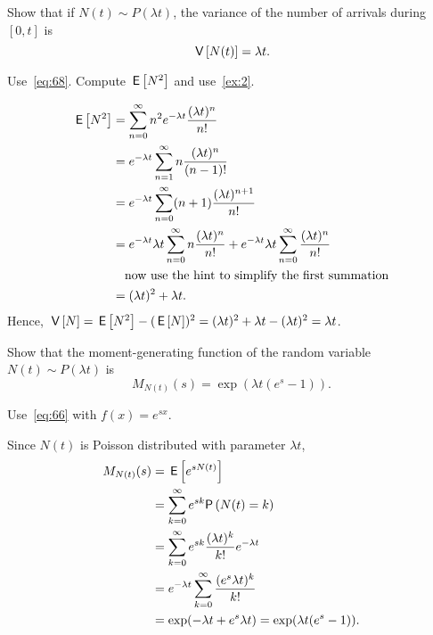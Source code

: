 \begin{extra}
  Show that if $N(t)\sim P(\lambda t)$, the variance of the number of arrivals during $[0,t]$ is
  \begin{equation*}
\,\mathsf{V}\left[N(t)\right] = \lambda t.
  \end{equation*}
\begin{hint} Use~\cref{eq:68}. Compute $\,\mathsf{E}\left[N^2\right]$ and use~\cref{ex:2}.
\end{hint}
\begin{solution} 

    \begin{align*}
      \,\mathsf{E}\left[N^2\right]
&= \sum_{n=0}^\infty n^2 e^{-\lambda t}\frac{(\lambda t)^n}{n!}  \\
&= e^{-\lambda t} \sum_{n=1}^\infty n \frac{(\lambda t)^n}{(n-1)!}  \\
&= e^{-\lambda t} \sum_{n=0}^\infty (n+1) \frac{(\lambda t)^{n+1}}{n!}  \\
&= e^{-\lambda t} \lambda t \sum_{n=0}^\infty n \frac{(\lambda t)^{n}}{n!}  +e^{-\lambda t}\lambda t \sum_{n=0}^\infty\frac{(\lambda t)^{n}}{n!}  \\
&\quad\text{now use the hint to simplify the first summation} \\
&= (\lambda t)^2  + \lambda t.
\end{align*}
Hence, $\,\mathsf{V}\left[N\right] = \,\mathsf{E}\left[N^2\right] - (\,\mathsf{E}\left[N\right])^2 = (\lambda t)^2 + \lambda t - (\lambda t)^2 = \lambda t$.
\end{solution}
\end{extra}

\begin{extra}\label{ex:53}
Show that the moment-generating function of the random variable~$N(t)\sim P(\lambda t)$ is
\begin{equation*}
M_{N(t)}(s) 
= \exp{(\lambda t(e^s-1))}.
\end{equation*}
\begin{hint}
Use~\cref{eq:66} with $f(x) = e^{sx}$.  \end{hint}
\begin{solution}
Since $N(t)$ is Poisson distributed with parameter $\lambda t$, 
\begin{align*}
M_{N(t)}(s)
&=  \E{e^{s N(t)}} \\
&= \sum_{k=0}^\infty e^{s k} \P{N(t)=k} \\
&= \sum_{k=0}^\infty e^{s k} \frac{(\lambda t)^k}{k!} e^{-\lambda t}  \\
&= e^{-\lambda t} \sum_{k=0}^\infty  \frac{(e^s \lambda t)^k}{k!}  \\
&= \exp(-\lambda t + e^s \lambda t) =\exp(\lambda t(e^s - 1)).
\end{align*}
\end{solution}
\end{extra}

